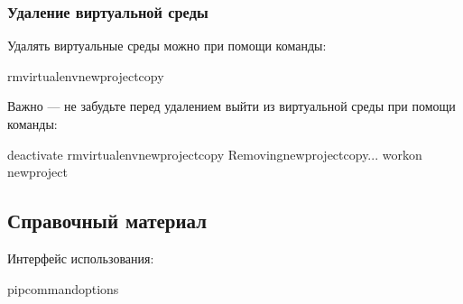 \documentclass[letterpaper,10pt,russian]{sphinxmanual}
\begin{document}
\subsubsection{Удаление виртуальной среды}
\label{\detokenize{educational_materials/path_venv/content:id7}}
\sphinxAtStartPar
Удалять виртуальные среды можно при помощи команды:

\begin{sphinxVerbatim}[commandchars=\\\{\}]
\PYGZdl{}rmvirtualenvnew\PYGZhy{}project\PYGZhy{}copy
\end{sphinxVerbatim}

\sphinxAtStartPar
Важно — не забудьте перед удалением выйти из виртуальной среды при помощи команды:

\begin{sphinxVerbatim}[commandchars=\\\{\}]
\PYGZdl{}deactivate
\PYGZdl{}rmvirtualenvnew\PYGZhy{}project\PYGZhy{}copy
Removingnew\PYGZhy{}project\PYGZhy{}copy...
\PYGZdl{}workon
new\PYGZhy{}project
\end{sphinxVerbatim}


\subsection{Справочный материал}
\label{\detokenize{educational_materials/path_venv/content:id8}}
\sphinxAtStartPar
{}

\sphinxAtStartPar
Интерфейс использования:

\begin{sphinxVerbatim}[commandchars=\\\{\}]
pip\PYGZlt{}command\PYGZgt{}\PYG{o}{[}options\PYG{o}{]}
\end{sphinxVerbatim}
\end{document}
